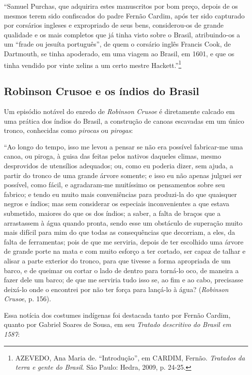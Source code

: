 \documentclass{article}
\begin{document}
``Samuel Purchas, que adquirira estes manuscritos por bom preço, depois
de os mesmos terem sido confiscados do padre Fernão Cardim, após ter
sido capturado por corsários ingleses e expropriado de seus bens,
considerou-os de grande qualidade e os mais completos que já tinha visto
sobre o Brasil, atribuindo-os a um ``frade ou jesuíta português'', de
quem o corsário inglês Francis Cook, de Dartmouth, se tinha apoderado,
em uma viagem ao Brasil, em 1601, e que os tinha vendido por vinte
xelins a um certo mestre Hackett.''\footnote{AZEVEDO, Ana Maria de.
  ``Introdução'', em CARDIM, Fernão. \emph{Tratados da terra e gente do
  Brasil}. São Paulo: Hedra, 2009, p. 24-25.}

\subsection{Robinson Crusoe e os índios do Brasil}

Um episódio notável do enredo de \emph{Robinson Crusoe} é diretamente
calcado em uma prática dos índios do Brasil, a construção de canoas
escavadas em um único tronco, conhecidas como \emph{pirocas} ou
\emph{pirogas}:

``Ao longo do tempo, isso me levou a pensar se não era possível
fabricar-me uma canoa, ou piroga, à guisa das feitas pelos nativos
daqueles climas, mesmo desprovidos de utensílios adequados; ou, como eu
poderia dizer, sem ajuda, a partir do tronco de uma grande árvore
somente; e isso eu não apenas julguei ser possível, como fácil, e
agradaram-me muitíssimo os pensamentos sobre seu fabrico; e tendo eu
muito mais conveniências para produzi-la do que quaisquer negros e
índios; mas sem considerar os especiais inconvenientes a que estava
submetido, maiores do que os dos índios; a saber, a falta de braços que
a arrastassem à água quando pronta, sendo esse um obstáculo de superação
muito mais difícil para mim do que todas as consequências que decorriam,
a eles, da falta de ferramentas; pois de que me serviria, depois de ter
escolhido uma árvore de grande porte na mata e com muito esforço a ter
cortado, ser capaz de talhar e alisar a parte exterior do tronco, para
que tivesse a forma apropriada de um barco, e de queimar ou cortar o
lado de dentro para torná-lo oco, de maneira a fazer dele um barco; de
que me serviria tudo isso se, ao fim e ao cabo, precisasse deixá-lo onde
o encontrei por não ter força para lançá-lo à água? (\emph{Robinson
Crusoe}, p. 156).

Essa notícia dos costumes indígenas foi destacada tanto por Fernão
Cardim, quanto por Gabriel Soares de Sousa, em seu \emph{Tratado
descritivo do Brasil em 1587}:
\end{document}
